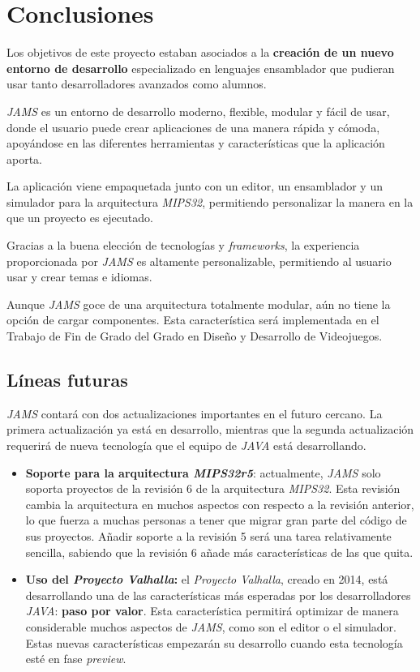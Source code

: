 \chapter{Conclusiones}\label{ch:conclusiones}

Los objetivos de este proyecto estaban asociados a la \textbf{creación
de un nuevo entorno de desarrollo} especializado en lenguajes
ensamblador que pudieran usar tanto desarrolladores avanzados
como alumnos.

\noindent \textit{JAMS} es un entorno de desarrollo moderno,
flexible, modular y fácil de usar, donde el usuario puede
crear aplicaciones de una manera rápida y cómoda,
apoyándose en las diferentes herramientas y
características que la aplicación aporta.

\noindent La aplicación viene empaquetada junto con un
editor, un ensamblador y un simulador para la arquitectura
\textit{MIPS32}, permitiendo personalizar la manera en la
que un proyecto es ejecutado.

\noindent Gracias a la buena elección de tecnologías y
\textit{frameworks}, la experiencia proporcionada por
\textit{JAMS} es altamente personalizable, permitiendo
al usuario usar y crear temas e idiomas.

\noindent Aunque \textit{JAMS} goce de una arquitectura
totalmente modular, aún no tiene la opción de cargar componentes.
Esta característica será implementada en el Trabajo de Fin de
Grado del Grado en Diseño y Desarrollo de Videojuegos.

\section{Líneas futuras}\label{sec:líneas-futuras}

\textit{JAMS} contará con dos actualizaciones importantes en el
futuro cercano.
La primera actualización ya está en desarrollo, mientras que la
segunda actualización requerirá de nueva tecnología que
el equipo de \textit{JAVA} está desarrollando.
\begin{itemize}
    \item \textbf{Soporte para la arquitectura \textit{MIPS32r5}}:
    actualmente, \textit{JAMS} solo soporta proyectos de la revisión 6
    de la arquitectura \textit{MIPS32}.
    Esta revisión cambia la arquitectura en muchos aspectos con respecto
    a la revisión anterior, lo que fuerza a muchas personas a tener
    que migrar gran parte del código de sus proyectos.
    Añadir soporte a la revisión 5 será una tarea relativamente sencilla,
    sabiendo que la revisión 6 añade más características de las que quita.
    \item \textbf{Uso del \textit{Proyecto Valhalla}:} el
    \textit{Proyecto Valhalla}\cite{PROJECT_VALHALLA}, creado en 2014,
    está desarrollando una de las características más esperadas
    por los desarrolladores \textit{JAVA}: \textbf{paso por valor}.
    Esta característica permitirá optimizar de manera considerable
    muchos aspectos de \textit{JAMS}, como son el editor o el simulador.
    Estas nuevas características empezarán su desarrollo cuando esta
    tecnología esté en fase \textit{preview}.
\end{itemize}

